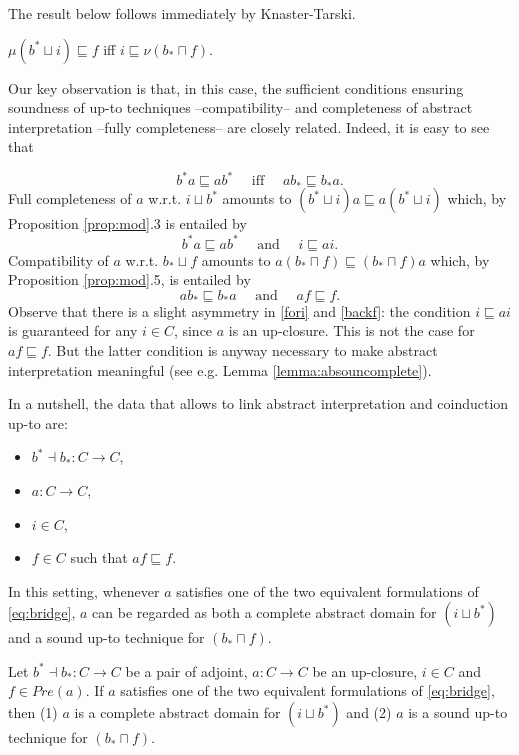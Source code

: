 \documentclass{llncs}
\begin{document}
The result below follows immediately by Knaster-Tarski.

\begin{corollary}\label{cor:coincidence}
$\mu (b^*\sqcup i)\sqsubseteq f$ iff $i \sqsubseteq \nu (b_*\sqcap f) $.
\end{corollary}

Our key observation is that, in this case, the sufficient conditions ensuring soundness of up-to techniques --compatibility-- and completeness of abstract interpretation --fully completeness-- are closely related. Indeed, it is easy to see that

\begin{equation}\label{eq:bridge}
b^*a \sqsubseteq ab^*\quad \text{ iff } \quad ab_* \sqsubseteq b_*a \text{.}
\end{equation}
Full completeness of $a$ w.r.t. $i\sqcup b^*$ amounts to $(b^* \sqcup i) a \sqsubseteq a (b^* \sqcup i)$
which, by Proposition \ref{prop:mod}.3 is entailed by 
\begin{equation}\label{fori}
b^*a \sqsubseteq a b^*  \quad \text{ and } \quad i \sqsubseteq ai \text{.}
\end{equation}
Compatibility of $a$ w.r.t. $b_*\sqcup f$ amounts to 
$
a(b_*\sqcap f) \sqsubseteq (b_* \sqcap f) a 
$
which, by Proposition \ref{prop:mod}.5, is entailed by 
\begin{equation}\label{backf}
ab_* \sqsubseteq b_*  a \quad \text{ and } \quad af \sqsubseteq f \text{.}
\end{equation}
Observe that there is a slight asymmetry in \eqref{fori} and \eqref{backf}: the condition $i \sqsubseteq ai $ is guaranteed for any $i\in C$, since $a$ is an up-closure. This is not the case for $af \sqsubseteq f $. But the latter condition is anyway necessary to make abstract interpretation meaningful (see e.g. Lemma \ref{lemma:absouncomplete}).

In a nutshell, the data that allows to link abstract interpretation and coinduction up-to are:
\begin{itemize}
\item $b^*\dashv b_* \colon C\to C$,
\item $a\colon C \to C$,
\item $i\in C$,
\item $f\in C$ such that $af \sqsubseteq f$.
\end{itemize}
In this setting, whenever $a$ satisfies one of the two equivalent formulations of \eqref{eq:bridge}, $a$ can be regarded as both a complete abstract domain for $(i \sqcup b^*)$ and a sound up-to technique for $(b_* \sqcap f)$.
%
%
\begin{theorem}
Let $b^*\dashv b_* \colon C\to C$ be a pair of adjoint, $a\colon C \to C$ be an up-closure, $i\in C$ and $f\in Pre(a)$.
%
If $a$ satisfies one of the two equivalent formulations of \eqref{eq:bridge}, then (1) $a$ is a complete abstract domain for $(i \sqcup b^*)$ and (2) $a$ is a sound up-to technique for $(b_* \sqcap f)$.
%
\end{theorem}
\end{document}

